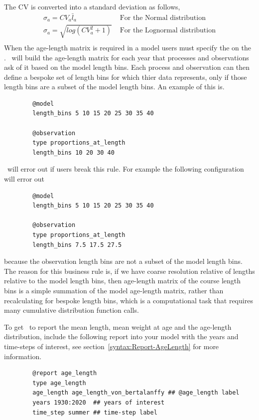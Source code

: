 %
The CV is converted into a standard deviation as follows,
\begin{align*}
	\sigma_a = CV_a \bar{l}_a & \text{ For the Normal distribution}\\
	\sigma_a = \sqrt{log(CV_a^2 + 1)} & \text{ For the Lognormal distribution}\\	
\end{align*}
%
When the age-length matrix is required in a model users must specify the  on the . \CNAME\ will build the age-length matrix for each year that processes and observations ask of it based on the model length bins. Each process and observation can then define a bespoke set of length bins for which thier data represents, only if those length bins are a subset of the model length bins. An example of this is.

{\small{\begin{verbatim}
		@model
		length_bins 5 10 15 20 25 30 35 40 
		
		@observation 
		type proportions_at_length
		length_bins 10 20 30 40
\end{verbatim}}}
\CNAME\ will error out if users break this rule. For example the following configuration will error out
{\small{\begin{verbatim}
		@model
		length_bins 5 10 15 20 25 30 35 40 
		
		@observation 
		type proportions_at_length
		length_bins 7.5 17.5 27.5
		\end{verbatim}}}
because the observation length bins are not a subset of the model length bins. The reason for this business rule is, if we have coarse resolution relative of lengths relative to the model length bins, then age-length matrix of the course length bins is a simple summation of the model age-length matrix, rather than recalculating for bespoke length bins, which is a computational task that requires many cumulative distribution function calls.




To get \CNAME\ to report the mean length, mean weight at age and the age-length distribution, include the following report into your model with the years and time-steps of interest, see section~\ref{syntax:Report-AgeLength} for more information.
{\small{\begin{verbatim}
		@report age_length
		type age_length 
		age_length age_length_von_bertalanffy ## @age_length label
		years 1930:2020  ## years of interest
		time_step summer ## time-step label
		\end{verbatim}}}
	
